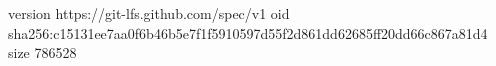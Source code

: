 version https://git-lfs.github.com/spec/v1
oid sha256:c15131ee7aa0f6b46b5e7f1f5910597d55f2d861dd62685ff20dd66c867a81d4
size 786528
